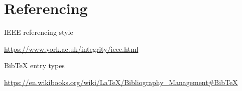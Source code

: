 \part{Referencing}
\frame{\partpage}

\begin{frame}{IEEE referencing style}
	\begin{center}
		\small\url{https://www.york.ac.uk/integrity/ieee.html}
	\end{center}
\end{frame}

\begin{frame}{BibTeX entry types}
	\begin{center}
		\small\url{https://en.wikibooks.org/wiki/LaTeX/Bibliography_Management\#BibTeX}
	\end{center}
\end{frame}
